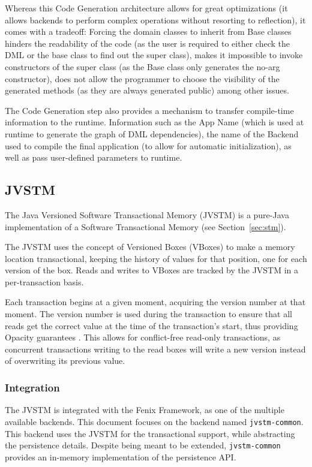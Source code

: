 \documentclass{llncs}
\begin{document}
Whereas this Code Generation architecture allows for great
optimizations (it allows backends to perform complex operations
without resorting to reflection), it comes with a tradeoff: Forcing
the domain classes to inherit from Base classes hinders the
readability of the code (as the user is required to either check the
DML or the base class to find out the super class), makes it
impossible to invoke constructors of the super class (as the Base
class only generates the no-arg constructor), does not allow the
programmer to choose the visibility of the generated methods (as they
are always generated public) among other issues.

The Code Generation step also provides a mechanism to transfer
compile-time information to the runtime. Information such as the App
Name (which is used at runtime to generate the graph of DML
dependencies), the name of the Backend used to compile the final
application (to allow for automatic initialization), as well as pass
user-defined parameters to runtime.

\subsection{JVSTM}
\label{sec:jvstm}

The Java Versioned Software Transactional Memory (JVSTM)
\cite{cachopo2006versioned} is a pure-Java implementation of a
Software Transactional Memory (see Section~\ref{sec:stm}).

The JVSTM uses the concept of Versioned Boxes (VBoxes) to make a
memory location transactional, keeping the history of values for that
position, one for each version of the box. Reads and writes to VBoxes
are tracked by the JVSTM in a per-transaction basis.

Each transaction begins at a given moment, acquiring the version
number at that moment. The version number is used during the
transaction to ensure that all reads get the correct value at the time
of the transaction's start, thus providing Opacity guarantees
\cite{guerraoui2008correctness}. This allows for conflict-free
read-only transactions, as concurrent transactions writing to the read
boxes will write a new version instead of overwriting its previous
value.

\subsubsection{Integration}

The JVSTM is integrated with the Fenix Framework, as one of the
multiple available backends. This document focuses on the backend
named \texttt{jvstm-common}. This backend uses the JVSTM for the
transactional support, while abstracting the persistence
details. Despite being meant to be extended, \texttt{jvstm-common}
provides an in-memory implementation of the persistence API.
\end{document}
